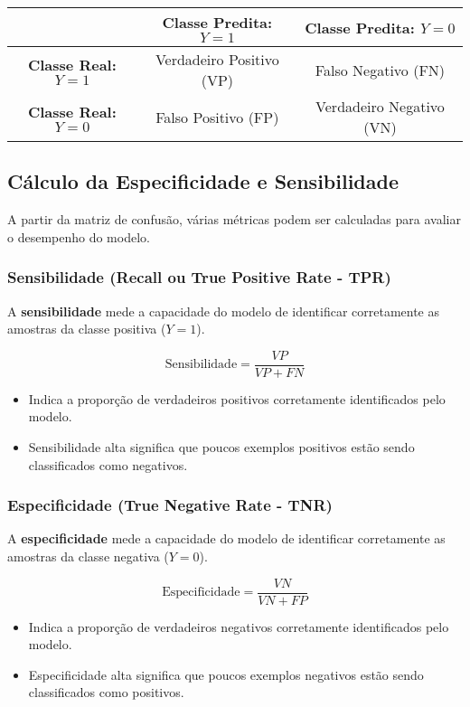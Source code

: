 \documentclass{sciposter}
\begin{document}
\begin{multicols}{3}
\begin{center}
\begin{tabular}{|c|c|c|}
\hline
 & \textbf{Classe Predita: $Y=1$} & \textbf{Classe Predita: $Y=0$} \\
\hline
\textbf{Classe Real: $Y=1$} & Verdadeiro Positivo (VP) & Falso Negativo (FN) \\
\hline
\textbf{Classe Real: $Y=0$} & Falso Positivo (FP) & Verdadeiro Negativo (VN) \\
\hline
\end{tabular}
\end{center}

\subsection{Cálculo da Especificidade e Sensibilidade}

A partir da matriz de confusão, várias métricas podem ser calculadas para avaliar o desempenho do modelo.

\subsubsection{Sensibilidade (Recall ou True Positive Rate - TPR)}

A \textbf{sensibilidade} mede a capacidade do modelo de identificar corretamente as amostras da classe positiva ($Y=1$).

\[
\text{Sensibilidade} = \frac{VP}{VP + FN}
\]

\begin{itemize}
    \item Indica a proporção de verdadeiros positivos corretamente identificados pelo modelo.
    \item Sensibilidade alta significa que poucos exemplos positivos estão sendo classificados como negativos.
\end{itemize}

\subsubsection{Especificidade (True Negative Rate - TNR)}

A \textbf{especificidade} mede a capacidade do modelo de identificar corretamente as amostras da classe negativa ($Y=0$).

\[
\text{Especificidade} = \frac{VN}{VN + FP}
\]

\begin{itemize}
    \item Indica a proporção de verdadeiros negativos corretamente identificados pelo modelo.
    \item Especificidade alta significa que poucos exemplos negativos estão sendo classificados como positivos.
\end{itemize}


\end{multicols}
\end{document}
